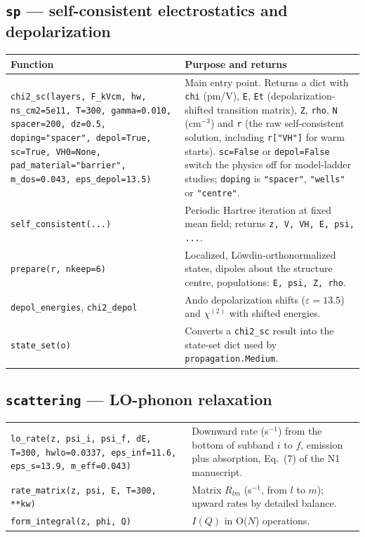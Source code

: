 \documentclass[11pt]{article}
\newcommand{\code}[1]{\texttt{#1}}
\begin{document}
\subsection{\code{sp} --- self-consistent electrostatics and depolarization}
\begin{longtable}{@{}>{\raggedright\arraybackslash}p{}>{\raggedright\arraybackslash}p{}@{}}
\toprule
Function & Purpose and returns \\ \midrule
\code{chi2\_sc(layers, F\_kVcm, hw, ns\_cm2=5e11, T=300, gamma=0.010, spacer=200, dz=0.5, doping="spacer", depol=True, sc=True, VH0=None, pad\_material="barrier", m\_dos=0.043, eps\_depol=13.5)} & Main entry point. Returns a dict with \code{chi} (pm/V), \code{E}, \code{Et} (depolarization-shifted transition matrix), \code{Z}, \code{rho}, \code{N} (cm$^{-3}$) and \code{r} (the raw self-consistent solution, including \code{r["VH"]} for warm starts). \code{sc=False} or \code{depol=False} switch the physics off for model-ladder studies; \code{doping} is \code{"spacer"}, \code{"wells"} or \code{"centre"}. \\
\code{self\_consistent(...)} & Periodic Hartree iteration at fixed mean field; returns \code{z, V, VH, E, psi, ...}. \\
\code{prepare(r, nkeep=6)} & Localized, L\"owdin-orthonormalized states, dipoles about the structure centre, populations: \code{E, psi, Z, rho}. \\
\code{depol\_energies}, \code{chi2\_depol} & Ando depolarization shifts ($\varepsilon=13.5$) and $\chi^{(2)}$ with shifted energies. \\
\code{state\_set(o)} & Converts a \code{chi2\_sc} result into the state-set dict used by \code{propagation.Medium}. \\ \bottomrule
\end{longtable}

\subsection{\code{scattering} --- LO-phonon relaxation}
\begin{longtable}{@{}>{\raggedright\arraybackslash}p{}>{\raggedright\arraybackslash}p{}@{}}
\toprule
\code{lo\_rate(z, psi\_i, psi\_f, dE, T=300, hwlo=0.0337, eps\_inf=11.6, eps\_s=13.9, m\_eff=0.043)} & Downward rate (s$^{-1}$) from the bottom of subband $i$ to $f$, emission plus absorption, Eq.~(7) of the N1 manuscript. \\
\code{rate\_matrix(z, psi, E, T=300, **kw)} & Matrix $R_{lm}$ (s$^{-1}$, from $l$ to $m$); upward rates by detailed balance. \\
\code{form\_integral(z, phi, Q)} & $I(Q)$ in O($N$) operations. \\ \bottomrule
\end{longtable}
\end{document}
